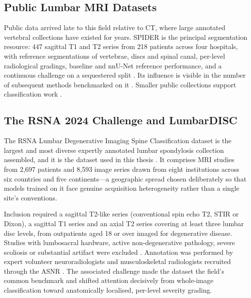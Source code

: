\subsection{Public Lumbar MRI Datasets}
\label{sec:lr-public-data}

Public data arrived late to this field relative to CT, where large annotated
vertebral collections have existed for years. SPIDER is the principal
segmentation resource: 447 sagittal T1 and T2 series from 218 patients across
four hospitals, with reference segmentations of vertebrae, discs and spinal
canal, per-level radiological gradings, baseline and nnU-Net reference
performance, and a continuous challenge on a sequestered split
\cite{vandergraaf2024lumbar}. Its influence is visible in the number of
subsequent methods benchmarked on it
\cite{ahmed2024pioneering,silveira2025automated,patil2026mribased,ghobrial2025deep}.
Smaller public collections support classification work
\cite{natalia2024lumbar,shahzadi2023nerve,nikpasand2024automated}.

\subsection{The RSNA 2024 Challenge and LumbarDISC}
\label{sec:lr-lumbardisc}

The RSNA Lumbar Degenerative Imaging Spine Classification dataset is the largest
and most diverse expertly annotated lumbar spondylosis collection assembled, and
it is the dataset used in this thesis \cite{richards2026the}. It comprises MRI
studies from 2{,}697 patients and 8{,}593 image series drawn from eight
institutions across six countries and five continents---a geographic spread
chosen deliberately so that models trained on it face genuine acquisition
heterogeneity rather than a single site's conventions.

Inclusion required a sagittal T2-like series (conventional spin echo T2, STIR or
Dixon), a sagittal T1 series and an axial T2 series covering at least three
lumbar disc levels, from outpatients aged 18 or over imaged for degenerative
disease. Studies with lumbosacral hardware, active non-degenerative pathology,
severe scoliosis or substantial artifact were excluded \cite{richards2026the}.
Annotation was performed by expert volunteer neuroradiologists and
musculoskeletal radiologists recruited through the ASNR
\cite{rsna2024rsna}. The associated challenge \cite{rsna2024rsna} made the
dataset the field's common benchmark and shifted attention decisively from
whole-image classification toward anatomically localised, per-level severity
grading.

